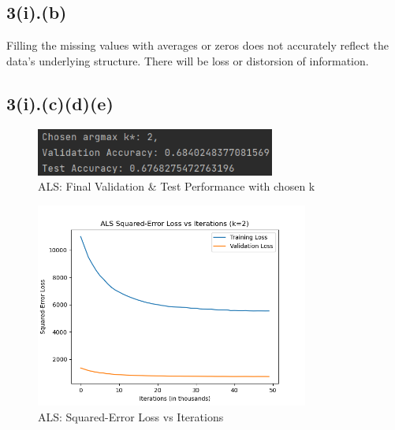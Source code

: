 \documentclass{article}
\begin{document}
\subsection*{3(i).(b)}
Filling the missing values with averages or zeros does not accurately reflect the data's underlying structure. There will be loss or distorsion of information.

\subsection*{3(i).(c)(d)(e)}
\begin{figure}[H]
    \centering
    \includegraphics[width=0.7\textwidth]{3(i)(c)(d).png}
    \caption{ALS: Final Validation \& Test Performance with chosen k\*}
\end{figure}
\begin{figure}[H]
    \centering
    \includegraphics[width=0.8\textwidth]{3(i)(e).png}
    \caption{ALS: Squared-Error Loss vs Iterations}
\end{figure}
\newpage
\end{document}
